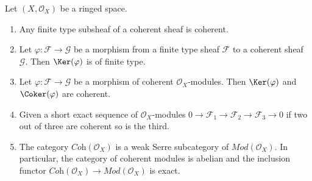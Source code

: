 \begin{lemma}
\label{lemma-coherent-abelian}
Let $(X, \mathcal{O}_X)$ be a ringed space.
\begin{enumerate}
\item Any finite type subsheaf of a coherent sheaf is coherent.
\item Let $\varphi : \mathcal{F} \to \mathcal{G}$
be a morphism from a finite type sheaf $\mathcal{F}$
to a coherent sheaf $\mathcal{G}$. Then $\Ker(\varphi)$ is of finite type.
\item Let $\varphi : \mathcal{F} \to \mathcal{G}$ be a morphism
of coherent $\mathcal{O}_X$-modules. Then
$\Ker(\varphi)$ and
$\Coker(\varphi)$ are coherent.
\item Given a short exact sequence of $\mathcal{O}_X$-modules
$0 \to \mathcal{F}_1 \to \mathcal{F}_2 \to \mathcal{F}_3 \to 0$
if two out of three are coherent so is the third.
\item The category $\textit{Coh}(\mathcal{O}_X)$ is a weak Serre subcategory
of $\textit{Mod}(\mathcal{O}_X)$. In particular, the category of
coherent modules is abelian and the inclusion functor
$\textit{Coh}(\mathcal{O}_X) \to \textit{Mod}(\mathcal{O}_X)$
is exact.
\end{enumerate}
\end{lemma}

